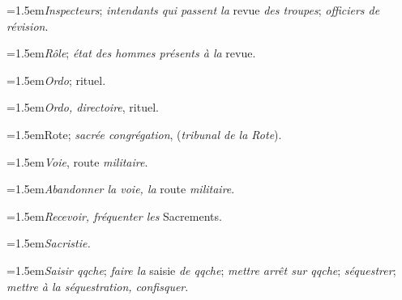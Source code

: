 \par{\dictfontsize\hangindent=1.5em\noindent \textit{Inspecteurs}; \textit{intendants qui passent la} revue \textit{des troupes}; \textit{officiers de révision}. \par}
\par{\dictfontsize\hangindent=1.5em\noindent \textit{Rôle}; \textit{état des hommes présents à la} revue. \par}
\par{\dictfontsize\hangindent=1.5em\noindent \textit{Ordo}; rituel. \par}
\par{\dictfontsize\hangindent=1.5em\noindent \textit{Ordo, directoire}, rituel. \par}
\par{\dictfontsize\hangindent=1.5em\noindent Rote; \textit{sacrée congrégation}, (\textit{tribunal de la Rote}). \par}
\par{\dictfontsize\hangindent=1.5em\noindent \textit{Voie}, route \textit{militaire}. \par}
\par{\dictfontsize\hangindent=1.5em\noindent \textit{Abandonner la voie, la} route \textit{militaire}. \par}
\par{\dictfontsize\hangindent=0pt\noindent{}\par}
\par{\dictfontsize\hangindent=1.5em\noindent \textit{Recevoir, fréquenter les} Sacrements. \par}
\par{\dictfontsize\hangindent=1.5em\noindent \textit{Sacristie.} \par}
\par{\dictfontsize\hangindent=1.5em\noindent \textit{Saisir qqche}; \textit{faire la} saisie \textit{de qqche}; \textit{mettre arrêt sur qqche}; \textit{séquestrer}; \textit{mettre à la séquestration, confisquer}. \par}
